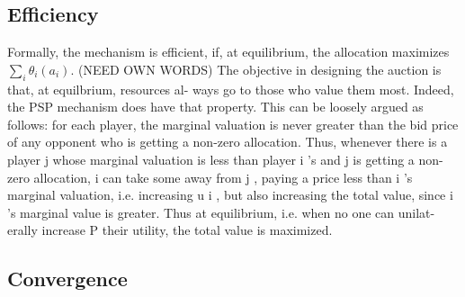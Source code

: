 \documentclass[sigconf, anonymous]{acmart}
\theoremstyle{definition}
\begin{document}
\subsection{Efficiency}

Formally, the
mechanism is efficient, if, at equilibrium, the allocation maximizes
$\sum_i\theta_i(a_i)$.
(NEED OWN WORDS)
The objective in designing the auction is that, at equilbrium, resources al-
ways go to those who value them most. Indeed, the PSP mechanism does
have that property. This can be loosely argued as follows: for each player,
the marginal valuation is never greater than the bid price of any opponent
who is getting a non-zero allocation. Thus, whenever there is a player j
whose marginal valuation is less than player i 's and j is getting a non-zero
allocation, i can take some away from j , paying a price less than i 's marginal
valuation, i.e. increasing u i , but also increasing the total value, since i 's
marginal value is greater. Thus at equilibrium, i.e. when no one can unilat-
erally increase P their utility, the total value is maximized.

\subsection{Convergence}

\end{document}
